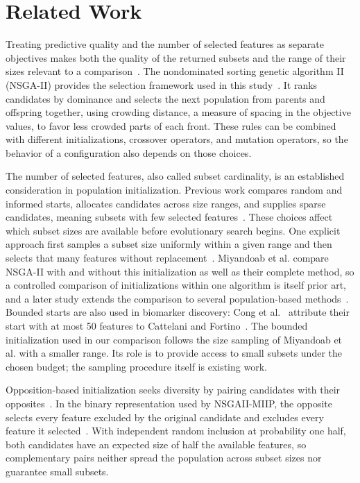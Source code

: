 
\section{Related Work}
\label{sec:related-work}

Treating predictive quality and the number of selected features as separate objectives makes both the quality of the returned subsets and the range of their sizes relevant to a comparison~\cite{Xue2016Survey,Jiao2024Survey}. The nondominated sorting genetic algorithm II (NSGA-II) provides the selection framework used in this study~\cite{Deb2002NSGAII}. It ranks candidates by dominance and selects the next population from parents and offspring together, using crowding distance, a measure of spacing in the objective values, to favor less crowded parts of each front. These rules can be combined with different initializations, crossover operators, and mutation operators, so the behavior of a configuration also depends on those choices.

The number of selected features, also called subset cardinality, is an established consideration in population initialization. Previous work compares random and informed starts, allocates candidates across size ranges, and supplies sparse candidates, meaning subsets with few selected features~\cite{Deniz2019,Deniz2022,Kropp2022}. These choices affect which subset sizes are available before evolutionary search begins. One explicit approach first samples a subset size uniformly within a given range and then selects that many features without replacement~\cite{Miyandoab2024}. Miyandoab et al. compare NSGA-II with and without this initialization as well as their complete method, so a controlled comparison of initializations within one algorithm is itself prior art, and a later study extends the comparison to several population-based methods~\cite{Miyandoab2026}. Bounded starts are also used in biomarker discovery: Cong et al.~\cite{Cong2026} attribute their start with at most 50 features to Cattelani and Fortino~\cite{Cattelani2022}. The bounded initialization used in our comparison follows the size sampling of Miyandoab et al. with a smaller range. Its role is to provide access to small subsets under the chosen budget; the sampling procedure itself is existing work.

Opposition-based initialization seeks diversity by pairing candidates with their opposites~\cite{Tizhoosh2005OBL}. In the binary representation used by NSGAII-MIIP, the opposite selects every feature excluded by the original candidate and excludes every feature it selected~\cite{Li2025}. With independent random inclusion at probability one half, both candidates have an expected size of half the available features, so complementary pairs neither spread the population across subset sizes nor guarantee small subsets.

